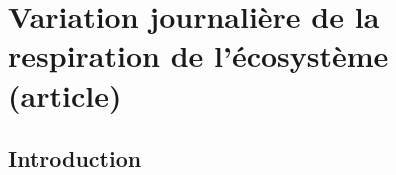 \chapter{Variation journalière de la respiration de l'écosystème (article)}

\minitoc

\newpage

\section{Introduction}
%
%
%
%
%

